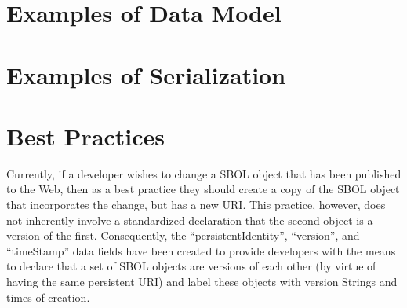 \documentclass[draftspec]{sbmlpkgspec}
\begin{document}
\section{Examples of Data Model}
\label{sec:examples}



\section{Examples of Serialization}

\section{Best Practices}
\label{sec:bestpractices}
Currently, if a developer wishes to change a SBOL object that has been published to the Web, then as a best practice they should create a copy of the SBOL object that incorporates the change, but has a new URI. This practice, however, does not inherently involve a standardized declaration that the second object is a version of the first. Consequently, the ``persistentIdentity'', ``version'', and ``timeStamp'' data fields have been created to provide developers with the means to declare that a set of SBOL objects are versions of each other (by virtue of having the same persistent URI) and label these objects with version Strings and times of creation.
\end{document}
